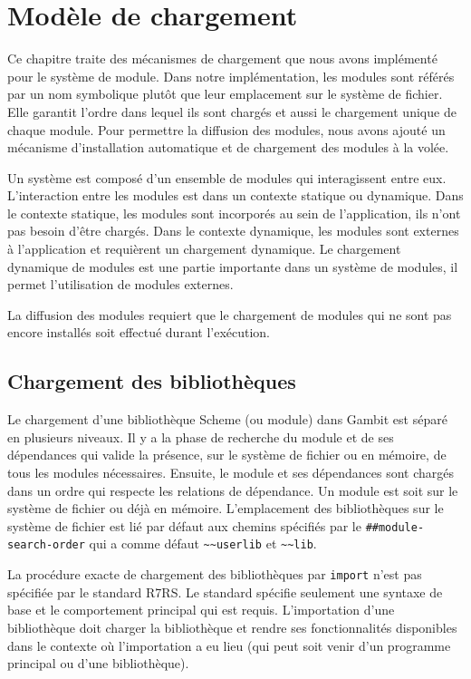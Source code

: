 
\chapter{Modèle de chargement}
\label{ch:loading-model}

Ce chapitre traite des mécanismes de chargement que nous avons implémenté pour
le système de module.  Dans notre implémentation, les modules sont référés par
un nom symbolique plutôt que leur emplacement sur le système de fichier. Elle
garantit l'ordre dans lequel ils sont chargés et aussi le chargement unique de
chaque module. Pour permettre la diffusion des modules, nous avons ajouté un
mécanisme d'installation automatique et de chargement des modules à la volée.

Un système est composé d'un ensemble de modules qui interagissent entre eux.
L'interaction entre les modules est dans un contexte statique ou dynamique.
Dans le contexte statique, les modules sont incorporés au sein de
l'application, ils n'ont pas besoin d'être chargés. Dans le contexte dynamique,
les modules sont externes à l'application et requièrent un chargement
dynamique.  Le chargement dynamique de modules est une partie importante dans
un système de modules, il permet l'utilisation de modules externes.

La diffusion des modules requiert que le chargement de modules qui ne sont
pas encore installés soit effectué durant l'exécution.

\section{Chargement des bibliothèques}


Le chargement d'une bibliothèque Scheme (ou module) dans Gambit est séparé en
plusieurs niveaux. Il y a la phase de recherche du module et de ses dépendances
qui valide la présence, sur le système de fichier ou en mémoire, de tous les
modules nécessaires.  Ensuite, le module et ses dépendances sont chargés dans un
ordre qui respecte les relations de dépendance.  Un module est soit sur le
système de fichier ou déjà en mémoire.  L'emplacement des bibliothèques sur le système de
fichier est lié par défaut aux chemins spécifiés par le
\lstinline{##module-search-order} qui a comme défaut \lstinline{~~userlib} et
\lstinline{~~lib}.

La procédure exacte de chargement des bibliothèques par \texttt{import} n'est pas
spécifiée par le standard R7RS. Le standard spécifie seulement une syntaxe de
base et le comportement principal qui est requis. L'importation d'une
bibliothèque doit charger la bibliothèque et rendre ses fonctionnalités
disponibles dans le contexte où l'importation a eu lieu (qui peut soit venir d'un
programme principal ou d'une bibliothèque).

